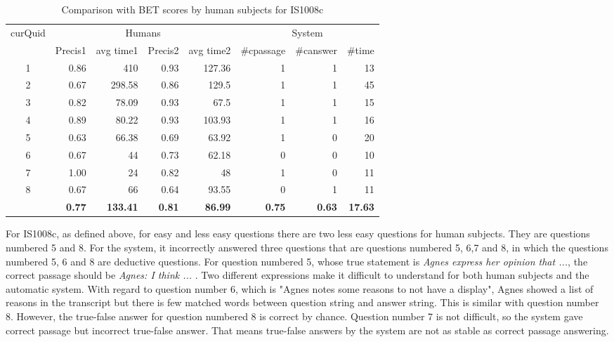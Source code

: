 \begin{table}[ht!]
\scriptsize
\caption{Comparison with BET scores by human subjects for IS1008c}
\begin{tabular}{|c|r|r|r|r|r|r|r|}
\hline
\multicolumn{ 1}{|c|}{curQuid} & \multicolumn{ 4}{c|}{Humans} & \multicolumn{ 3}{c|}{System} \\ \cline{ 2- 8}
\multicolumn{ 1}{|l|}{} & \multicolumn{1}{c|}{Precis1} & \multicolumn{1}{c|}{avg time1} & \multicolumn{1}{c|}{Precis2} & \multicolumn{1}{c|}{avg time2} & \multicolumn{1}{c|}{\#cpassage} & \multicolumn{1}{c|}{\#canswer} & \multicolumn{1}{c|}{\#time} \\ \hline
1 & 0.86 & 410 & 0.93 & 127.36 & 1 & 1 & 13 \\ \hline
2 & 0.67 & 298.58 & 0.86 & 129.5 & 1 & 1 & 45 \\ \hline
3 & 0.82 & 78.09 & 0.93 & 67.5 & 1 & 1 & 15 \\ \hline
4 & 0.89 & 80.22 & 0.93 & 103.93 & 1 & 1 & 16 \\ \hline
5 & 0.63 & 66.38 & 0.69 & 63.92 & 1 & 0 & 20 \\ \hline
6 & 0.67 & 44 & 0.73 & 62.18 & 0 & 0 & 10 \\ \hline
7 & 1.00 & 24 & 0.82 & 48 & 1 & 0 & 11 \\ \hline
8 & 0.67 & 66 & 0.64 & 93.55 & 0 & 1 & 11 \\ \hline
\multicolumn{1}{|l|}{} & \textbf{0.77} & \textbf{133.41} & \textbf{0.81} & \textbf{86.99} & \textbf{0.75} & \textbf{0.63} & \textbf{17.63} \\ \hline
\end{tabular}
\label{table: BET scores for IS1008c}
\end{table}

For IS1008c, as defined above, for easy and less easy questions there are two less easy questions for human subjects. They are questions numbered 5 and 8. For the system, it incorrectly answered three questions that are questions numbered 5, 6,7 and 8, in which the questions numbered 5, 6 and 8 are deductive questions. For question numbered 5, whose true statement is \textit{Agnes express her opinion that ...}, the correct passage should be \textit{Agnes: I think ... }. Two different expressions make it difficult to understand for both human subjects and the automatic system. With regard to question number 6, which is "Agnes notes some reasons to not have a display", Agnes showed a list of reasons in the transcript but there is few matched words between question string and answer string. This is similar with question number 8. However, the true-false answer for question numbered 8 is correct by chance. Question number 7 is not difficult, so the system gave correct passage but incorrect true-false answer. That means true-false answers by the system are not as stable as correct passage answering.

